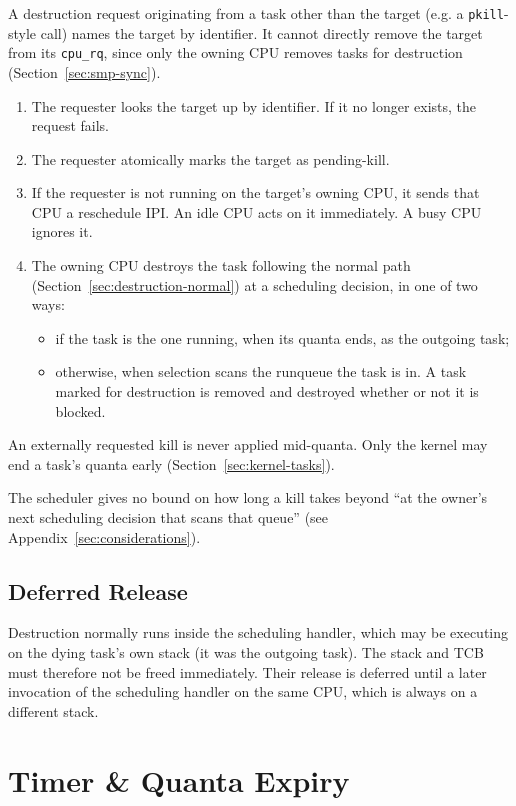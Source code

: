 \documentclass[11pt]{article}
\begin{document}
A destruction request originating from a task other than the target (e.g. a \texttt{pkill}-style call) names the target by identifier.
It cannot directly remove the target from its \texttt{cpu\_rq}, since only the owning CPU removes tasks for destruction (Section~\ref{sec:smp-sync}).

\begin{enumerate}
	\item The requester looks the target up by identifier. If it no longer exists, the request fails.
	\item The requester atomically marks the target as pending-kill.
	\item If the requester is not running on the target's owning CPU, it sends that CPU a reschedule IPI. An idle CPU acts on it immediately. A busy CPU ignores it.
	\item The owning CPU destroys the task following the normal path (Section~\ref{sec:destruction-normal}) at a scheduling decision, in one of two ways:
	      \begin{itemize}
		      \item if the task is the one running, when its quanta ends, as the outgoing task;
		      \item otherwise, when selection scans the runqueue the task is in. A task marked for destruction is removed and destroyed whether or not it is blocked.
	      \end{itemize}
\end{enumerate}

An externally requested kill is never applied mid-quanta.
Only the kernel may end a task's quanta early (Section~\ref{sec:kernel-tasks}).

The scheduler gives no bound on how long a kill takes beyond ``at the owner's next scheduling decision that scans that queue'' (see Appendix~\ref{sec:considerations}).

\subsection{Deferred Release}
\label{sec:destruction-deferred}

Destruction normally runs inside the scheduling handler, which may be executing on the dying task's own stack (it was the outgoing task).
The stack and TCB must therefore not be freed immediately. Their release is deferred until a later invocation of the scheduling handler on the same CPU, which is always on a different stack.

\section{Timer \& Quanta Expiry}
\label{sec:timer-expiry}
\end{document}
